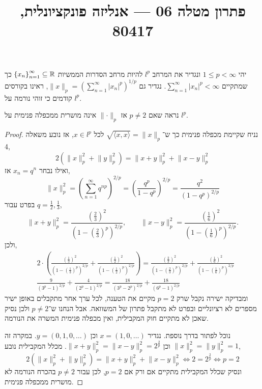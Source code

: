 
\title{פתרון מטלה 06 --- אנליזה פונקציונלית, 80417}


\maketitle
\maketitleprint[teal]

\question{}
יהי $1 \le p < \infty$ ונגדיר את המרחב $l^p$ להיות מרחב הסדרות הממשיות ${\{ x_n \}}_{n = 1}^\infty \subseteq \mathbb{R}$ כך שמתקיים $\sum_{n = 1}^\infty {| x_n |}^p < \infty$.
נגדיר גם $\lVert x \rVert_p = {\left(\sum_{n = 1}^\infty {| x_n |}^p \right)}^{1/p}$, ראינו בקורסים קודמים כי זוהי נורמה על $l^p$.

\subquestion{}
נראה שאם $p \ne 2$ אז $\lVert \cdot \rVert_p$ אינה מושרית ממכפלה פנימית על $l^p$.
\begin{proof}
	נניח שקיימת מכפלה פנימית כך ש־$\sqrt{\langle x, x \rangle} = \lVert x \rVert_p$ לכל $x \in l^p$, אז נובע משאלה 4,
	\[
		2(\lVert x \rVert_p^2 + \lVert y \rVert_p^2)
		= \lVert x + y \rVert_p^2 + \lVert x - y \rVert_p^2
	\]
	ואילו נבחר $x_n = q^n$ אז,
	\[
		\lVert x \rVert_p^2
		= {\left(\sum_{n = 1}^\infty q^{np} \right)}^{2/p}
		= {\left( \frac{q^p}{1 - q^p} \right)}^{2/p}
		= \frac{q^2}{{(1 - q^p)}^{2/p}}
	\]
	בפרט עבור $q = \frac{1}{2}, \frac{1}{3}$,
	\[
		\lVert x + y \rVert_p^2
		= \frac{{(\frac{2}{3})}^2}{{(1 - {(\frac{2}{3})}^p)}^{2/p}},
		\qquad
		\lVert x - y \rVert_p^2
		= \frac{{(\frac{1}{6})}^2}{{(1 - {(\frac{1}{6})}^p)}^{2/p}}
	.\]
	ולכן,
	\begin{align*}
		& 2 \cdot \left(\frac{{(\frac{1}{3})}^2}{{(1 - {(\frac{1}{3})}^p)}^{2/p}} + \frac{{(\frac{1}{2})}^2}{{(1 - {(\frac{1}{2})}^p)}^{2/p}}\right)
		= \frac{{(\frac{2}{3})}^2}{{(1 - {(\frac{2}{3})}^p)}^{2/p}} + \frac{{(\frac{1}{6})}^2}{{(1 - {(\frac{1}{6})}^p)}^{2/p}} \\
		& \frac{9}{{(3^p - 1)}^{2/p}} + \frac{4}{{(2^p - 1)}^{2/p}} = \frac{18}{{(3^p - 2^p)}^{2/p}} + \frac{18}{{(6^p - 1)}^{2 / p}}
	\end{align*}
	ומבדיקה ישירה נקבל שרק $p = 2$ מקיים את הטענה, לכל ערך אחר מתקבלים באופן ישיר מספרים לא רציונליים ובפרט לא מתקבל פתרון של המשוואה.
	אבל הנחנו ש־$p \ne 2$ ולכן נסיק שאכן לא מתקיים חוק המקבילית, ואין מכפלה פנימית המשרה את הנורמה.

	נוכל לפתור בדרך נוספת.
	נגדיר $x = (1, 0, \ldots)$ וכן $y = (0, 1, 0, \ldots)$.
	במקרה זה $\lVert x \rVert_p^2 = \lVert y \rVert_p^2 = 1$ וכן $\lVert x + y \rVert_p^2 = \lVert x - y \rVert_p^2 = 2^{\frac{2}{p}}$.
	מכלל המקבילית נובע,
	\[
		2 (\lVert x \rVert_p^2 + \lVert y \rVert_p^2)
		= \lVert x + y \rVert_p^2 + \lVert x - y \rVert_p^2
		\iff 2 = 2^{\frac{2}{p}}
		\iff p = 2
	\]
	ונסיק שכלל המקבילית מתקיים אם ורק אם $p = 2$, לכן עבור $p \ne 2$ בהכרח הנורמה לא מושרית ממכפלה פנימית.
\end{proof}

